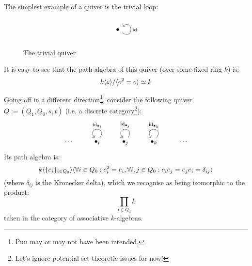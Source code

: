             \begin{example} \label{example: path_algebras_of_discrete_quivers}
                The simplest example of a quiver is the trivial loop:
                    \begin{figure}[H]
                        \centering
                            $$
                                \begin{tikzcd}
                                    \bullet \arrow["\id"', loop, distance=2em, in=35, out=325]
                                \end{tikzcd}
                            $$
                        \caption{The trivial quiver}
                        \label{fig: trivial_quiver}
                    \end{figure}
                It is easy to see that the path algebra of this quiver (over some fixed ring $k$) is:
                    $$k\langle e\rangle/\langle e^2 = e\rangle \simeq k$$
                    
                Going off in a different direction\footnote{Pun may or may not have been intended.}, consider the following quiver $Q := (Q_1, Q_0, s, t)$ (i.e. a discrete category\footnote{Let's ignore potential set-theoretic issues for now!}):
                    $$
                        \begin{tikzcd}
                            \cdots & \bullet_i \arrow["\id_{\bullet_i}"', loop, distance=2em, in=125, out=55] & \bullet_j \arrow["\id_{\bullet_j}"', loop, distance=2em, in=125, out=55] & \bullet_k \arrow["\id_{\bullet_k}"', loop, distance=2em, in=125, out=55] & \cdots
                        \end{tikzcd}
                    $$
                Its path algebra is:
                    $$k\langle\{e_i\}_{i \in Q_0}\rangle\/\langle\forall i \in Q_0: e_i^2 = e_i, \forall i, j \in Q_0: e_i e_j = e_j e_i = \delta_{ij}\rangle$$
                (where $\delta_{ij}$ is the Kronecker delta), which we recognise as being isomorphic to the product:
                    $$\prod_{i \in Q_0} k$$
                taken in the category of associative $k$-algebras.
            \end{example}
